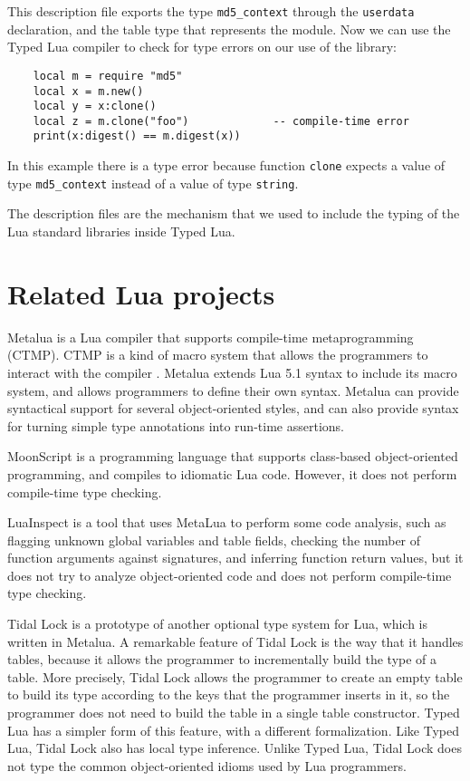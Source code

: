 This description file exports the type \texttt{md5\string_context}
through the \texttt{userdata} declaration, and the table type
that represents the module.
Now we can use the Typed Lua compiler to check for type errors on
our use of the library:
\begin{verbatim}
    local m = require "md5"
    local x = m.new()
    local y = x:clone()
    local z = m.clone("foo")             -- compile-time error
    print(x:digest() == m.digest(x))
\end{verbatim}

In this example there is a type error because function \texttt{clone}
expects a value of type \texttt{md5\string_context} instead of a value
of type \texttt{string}.

The description files are the mechanism that we used to include the
typing of the Lua standard libraries inside Typed Lua.

\section{Related Lua projects}

Metalua \citep{metalua} is a Lua compiler that supports compile-time
metaprogramming (CTMP).
CTMP is a kind of macro system that allows the programmers to interact
with the compiler \citep{fleutot2007contrasting}. 
Metalua extends Lua 5.1 syntax to include its macro system,
and allows programmers to define their own syntax.
Metalua can provide syntactical support for several object-oriented
styles, and can also provide syntax for turning simple type
annotations into run-time assertions.

MoonScript \citep{moonscript} is a programming language that supports
class-based object-oriented programming, and compiles to idiomatic
Lua code.
However, it does not perform compile-time type checking.

LuaInspect \citep{luainspect} is a tool that uses MetaLua to perform
some code analysis, such as flagging unknown global variables and
table fields, checking the number of function arguments against
signatures, and inferring function return values, but it does not
try to analyze object-oriented code and does not perform compile-time
type checking.

Tidal Lock \citep{tidallock} is a prototype of another optional type
system for Lua, which is written in Metalua.
A remarkable feature of Tidal Lock is the way that it handles tables,
because it allows the programmer to incrementally build the type of
a table.
More precisely, Tidal Lock allows the programmer to create an empty
table to build its type according to the keys that the programmer
inserts in it, so the programmer does not need to build the table in
a single table constructor.
Typed Lua has a simpler form of this feature, with a different
formalization.
Like Typed Lua, Tidal Lock also has local type inference.
Unlike Typed Lua, Tidal Lock does not type the common object-oriented
idioms used by Lua programmers.

